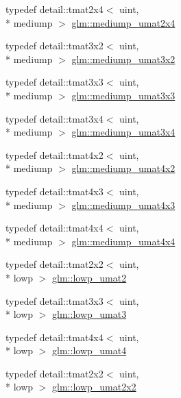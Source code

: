 \begin{DoxyCompactItemize}
\item 
typedef detail\-::tmat2x4$<$ uint, \\*
mediump $>$ \hyperlink{group__gtc__matrix__integer_gaf79e9c80f024d31f3d66ddae75e90b6c}{glm\-::mediump\-\_\-umat2x4}
\item 
typedef detail\-::tmat3x2$<$ uint, \\*
mediump $>$ \hyperlink{group__gtc__matrix__integer_ga65a9fdb1a5918fe6f308577065983e23}{glm\-::mediump\-\_\-umat3x2}
\item 
typedef detail\-::tmat3x3$<$ uint, \\*
mediump $>$ \hyperlink{group__gtc__matrix__integer_ga31a05e7b2a6a596bdc7ceeb5d9c10e1c}{glm\-::mediump\-\_\-umat3x3}
\item 
typedef detail\-::tmat3x4$<$ uint, \\*
mediump $>$ \hyperlink{group__gtc__matrix__integer_ga8113e067e1f327fac64cf9015c8c5431}{glm\-::mediump\-\_\-umat3x4}
\item 
typedef detail\-::tmat4x2$<$ uint, \\*
mediump $>$ \hyperlink{group__gtc__matrix__integer_ga8ea45737e8bc9bfae2668968056b109f}{glm\-::mediump\-\_\-umat4x2}
\item 
typedef detail\-::tmat4x3$<$ uint, \\*
mediump $>$ \hyperlink{group__gtc__matrix__integer_gaebe3b1b4b6030c096447e40fb00528f4}{glm\-::mediump\-\_\-umat4x3}
\item 
typedef detail\-::tmat4x4$<$ uint, \\*
mediump $>$ \hyperlink{group__gtc__matrix__integer_ga24b1c76fefa58f810e24cafe0ea6a6a0}{glm\-::mediump\-\_\-umat4x4}
\item 
typedef detail\-::tmat2x2$<$ uint, \\*
lowp $>$ \hyperlink{group__gtc__matrix__integer_ga09df85e6b5e53f66a86d042e0633bfbc}{glm\-::lowp\-\_\-umat2}
\item 
typedef detail\-::tmat3x3$<$ uint, \\*
lowp $>$ \hyperlink{group__gtc__matrix__integer_ga7160c0ac500826224d3baf1003c0432c}{glm\-::lowp\-\_\-umat3}
\item 
typedef detail\-::tmat4x4$<$ uint, \\*
lowp $>$ \hyperlink{group__gtc__matrix__integer_ga571dcc0328ddd1d8c54eba047b5bfa2f}{glm\-::lowp\-\_\-umat4}
\item 
typedef detail\-::tmat2x2$<$ uint, \\*
lowp $>$ \hyperlink{group__gtc__matrix__integer_gaa4dfe67706187e459004b9a6c500b048}{glm\-::lowp\-\_\-umat2x2}

\end{DoxyCompactItemize}
